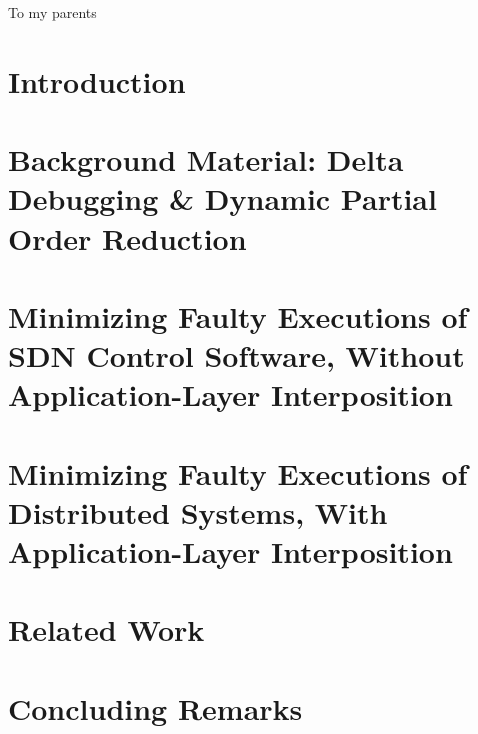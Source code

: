 

\begin{abstract}

\end{abstract}

\begin{frontmatter}

\begin{dedication}
\null\vfil
{\large
\begin{center}
To my parents
\end{center}}
\null\vfil
\end{dedication}

\tableofcontents
\listoffigures %
\listoftables %

\makeatletter
\let\@currsize\normalsize
\makeatother
{}
\setlength{\parskip}{.25\baselineskip}%



\end{frontmatter}

\makeatletter
\let\@currsize\normalsize
\makeatother
{}
\setlength{\parskip}{.25\baselineskip}%

\chapter{Introduction}
\label{sec:intro}


\chapter{Background Material: Delta Debugging \& Dynamic Partial Order
Reduction}
\label{sec:background_material}


\chapter{Minimizing Faulty Executions of SDN Control Software, Without Application-Layer Interposition}
\label{sec:sts}


\chapter{Minimizing Faulty Executions of Distributed Systems, With Application-Layer Interposition}
\label{sec:demi}


\chapter{Related Work}
\label{sec:related_work}


\chapter{Concluding Remarks}
\label{main_sec:conclusion}


%

%


\printbibliography


